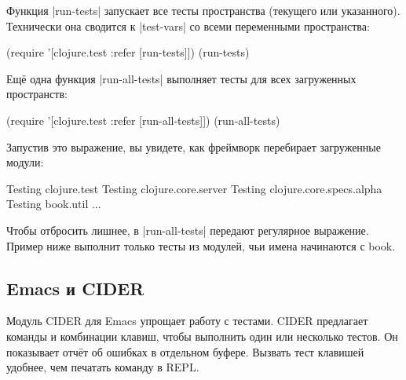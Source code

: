 
Функция \spverb|run-tests| запускает все тесты пространства (текущего или
указанного). Технически она сводится к \spverb|test-vars| со всеми переменными
пространства:

\begin{english}
  \begin{clojure}
(require '[clojure.test :refer [run-tests]])
(run-tests)
  \end{clojure}
\end{english}


Ещё одна функция \spverb|run-all-tests| выполняет тесты для всех загруженных
пространств:

\begin{english}
  \begin{clojure}
(require '[clojure.test :refer [run-all-tests]])
(run-all-tests)
  \end{clojure}
\end{english}

Запустив это выражение, вы увидете, как фреймворк перебирает загруженные модули:

\begin{english}
  \begin{text}
Testing clojure.test
Testing clojure.core.server
Testing clojure.core.specs.alpha
Testing book.util
...
  \end{text}
\end{english}


Чтобы отбросить лишнее, в \spverb|run-all-tests| передают регулярное выражение.
Пример ниже выполнит только тесты из модулей, чьи имена начинаются с book.

\begin{english}
\end{english}

\subsection{Emacs и CIDER}


Модуль CIDER для Emacs упрощает
работу с тестами. CIDER предлагает команды и комбинации клавиш, чтобы выполнить
один или несколько тестов. Он показывает отчёт об ошибках в отдельном
буфере. Вызвать тест клавишей удобнее, чем печатать команду в REPL.

